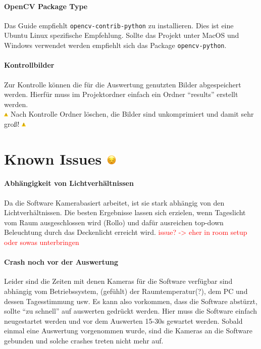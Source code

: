 \documentclass[a4paper, 10pt]{article}
\newcommand{\warn}[1]{\textcolor{red}{#1}}
\newcommand{\code}[1]{\texttt{#1}}
\begin{document}
\paragraph{OpenCV Package Type}
Das Guide empfiehlt \code{opencv-contrib-python} zu installieren. Dies ist eine Ubuntu Linux spezifische Empfehlung. Sollte das Projekt unter MacOS und Windows verwendet werden empfiehlt sich das Package \code{opencv-python}.

\paragraph{Kontrollbilder}
Zur Kontrolle können die für die Auswertung genutzten Bilder abgespeichert werden. Hierfür muss im Projektordner einfach ein Ordner \enquote{results} erstellt werden.
\\
{\footnotesize \includegraphics[height=0.6em]{emojis/warning.png} Nach Kontrolle Ordner löschen, die Bilder sind unkomprimiert und damit sehr groß! \includegraphics[height=0.6em]{emojis/warning.png}}

\section{Known Issues \includegraphics[height=0.65em]{emojis/pensive.png}}
\label{sec:known-issues}
\paragraph{Abhängigkeit von Lichtverhältnissen} Da die Software Kamerabasiert arbeitet, ist sie stark abhängig von den Lichtverhältnissen. Die besten Ergebnisse lassen sich erzielen, wenn Tageslicht vom Raum ausgeschlossen wird (Rollo) und dafür ausreichen top-down Beleuchtung durch das Deckenlicht erreicht wird. \warn{issue? -> eher in room setup oder sowas unterbringen}

\paragraph{Crash noch vor der Auswertung} Leider sind die Zeiten mit denen  Kameras für die Software verfügbar sind abhängig vom Betriebssystem, (gefühlt) der Raumtemperatur(?), dem PC und dessen Tagesstimmung usw. Es kann also vorkommen, dass die Software abstürzt, sollte \enquote{zu schnell} auf auswerten gedrückt werden. Hier muss die Software einfach neugestartet werden und vor dem Auswerten 15-30s gewartet werden. Sobald einmal eine Auswertung vorgenommen wurde, sind die Kameras an die Software gebunden und solche crashes treten nicht mehr auf.
\end{document}
